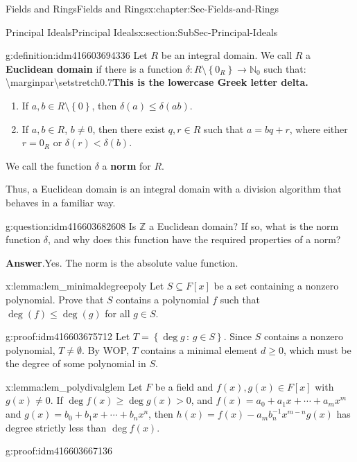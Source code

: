 \documentclass[oneside,10pt,]{book}
\newcommand{\terminology}[1]{\textbf{#1}}
\numberwithin{equation}{section}
\renewcommand{\le}{\leqslant}
\renewcommand{\ge}{\geqslant}
\newcommand{\set}[1]{\left\{ {#1} \right\}}
\newcommand{\setof}[2]{{\left\{#1\,\colon\,#2\right\}}}
\def\Z{{\mathbb Z}}
\def\N{{\mathbb N}}
\newcommand{\lt}{<}
\begin{document}
\begin{chapterptx}{Fields and Rings}{}{Fields and Rings}{}{}{x:chapter:Sec-Fields-and-Rings}
\begin{sectionptx}{Principal Ideals}{}{Principal Ideals}{}{}{x:section:SubSec-Principal-Ideals}
\begin{definition}{}{g:definition:idm416603694336}
Let \(R\) be an integral domain. We call \(R\) a \terminology{Euclidean domain} if there is a function \(\delta : R\setminus \set{0_R} \to \N_0\) such that: \textbackslash{}marginpar\textbraceleft{}\textbackslash{}setstretch\textbraceleft{}0.7\textbraceright{}\terminology{This is the lowercase Greek letter \terminology{delta}.}\textbraceright{}%
\begin{enumerate}
\item{}If \(a,b\in R\setminus \set{0}\), then \(\delta(a) \le \delta(ab)\).%
\item{}If \(a,b\in R\), \(b\ne 0\), then there exist \(q,r\in R\) such that \(a = bq+r\), where either \(r = 0_R\) or \(\delta(r) \lt \delta(b)\).%
\end{enumerate}
%
\par
We call the function \(\delta\) a \terminology{norm} for \(R\).%
\end{definition}
Thus, a Euclidean domain is an integral domain with a division algorithm that behaves in a familiar way.%
\begin{question}{}{g:question:idm416603682608}%
Is \(\Z\) a Euclidean domain? If so, what is the norm function \(\delta\), and why does this function have the required properties of a norm?%
\par\smallskip%
\noindent\textbf{Answer}.\hypertarget{g:answer:idm416603680528}{}\quad{}Yes. The norm is the absolute value function.%
\end{question}
\begin{lemma}{}{}{x:lemma:lem_minimaldegreepoly}%
Let \(S\subseteq F[x]\) be a set containing a nonzero polynomial. Prove that \(S\) contains a polynomial \(f\) such that \(\deg(f) \le \deg(g)\) for all \(g\in S\).%
\end{lemma}
\begin{proofptx}{}{g:proof:idm416603675712}
Let \(T = \setof{\deg g}{g\in S}\). Since \(S\) contains a nonzero polynomial, \(T\ne \emptyset\). By WOP, \(T\) contains a minimal element \(d \ge 0\), which must be the degree of some polynomial in \(S\).%
\end{proofptx}
\begin{lemma}{}{}{x:lemma:lem_polydivalglem}%
Let \(F\) be a field and \(f(x),g(x)\in F[x]\) with \(g(x)\ne 0\). If \(\deg f(x) \ge \deg g(x) > 0\), and \(f(x) = a_0 + a_1 x + \cdots + a_m x^m\) and \(g(x) = b_0 + b_1 x + \cdots + b_n x^n\), then \(h(x) = f(x) - a_m b_n^{-1} x^{m-n} g(x)\) has degree strictly less than \(\deg f(x)\).%
\end{lemma}
\begin{proofptx}{}{g:proof:idm416603667136}

\end{proofptx}
\end{sectionptx}
\end{chapterptx}
\end{document}
